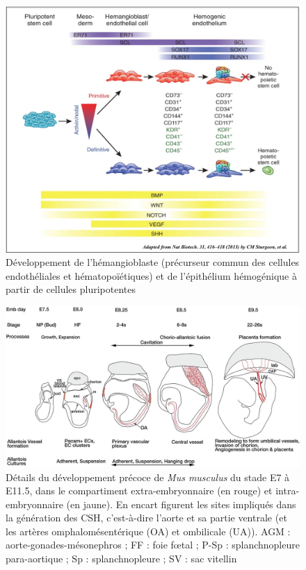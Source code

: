 \documentclass[fleqn,11pt]{SelfArx} %
\begin{document}
\begin{figure}[ht]
\centering
\includegraphics[width=\linewidth]{images/syntheseSuper}
\caption{Développement de l'hémangioblaste (précurseur commun des cellules endothéliales et hématopoïétiques) et de l'épithélium hémogénique à partir de cellules pluripotentes\href{http://cdn.intechopen.com/pdfs-wm/46823.pdf}{\cite{Chen}}}
\label{fig:syntheseSuper}
\end{figure}


\begin{figure}[ht]
\centering
\includegraphics[width=\linewidth]{images/devpt}
\caption{Détails du développement précoce de \textit{Mus musculus}\href{http://www.ipubli.inserm.fr/handle/10608/6217}{\cite{Gaudin}} du stade E7 à E11.5, dans le compartiment extra-embryonnaire (en rouge) et intra-embryonnaire (en jaune). En encart figurent les sites impliqués dans la génération des CSH, c’est-à-dire l’aorte et sa partie ventrale (et les artères omphalomésentérique (OA) et ombilicale (UA)). AGM : aorte-gonades-mésonephros ; FF : foie fœtal ; P-Sp : splanchnopleure para-aortique ; Sp : splanchnopleure ; SV : sac vitellin}
\label{fig:devpt}
\end{figure}
\end{document}
